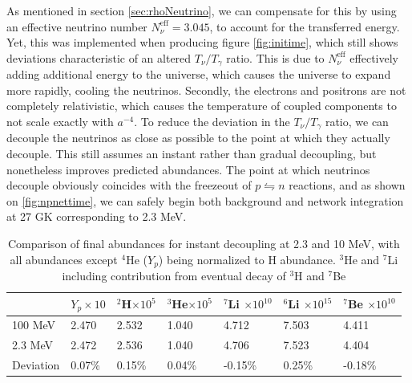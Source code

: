 As mentioned in section \ref{sec:rhoNeutrino}, we can compensate for this by using an effective neutrino number $N_\nu^\text{eff}=3.045$, to account for the transferred energy. Yet, this was implemented when producing figure \ref{fig:initime}, which still shows deviations characteristic of an altered $T_\nu/T_\gamma$ ratio. This is due to $N_\nu^\text{eff}$ effectively adding additional energy to the universe, which causes the universe to expand more rapidly, cooling the neutrinos. Secondly, the electrons and positrons are not completely relativistic, which causes the temperature of coupled components to not scale exactly with $a^{-4}$. To reduce the deviation in the $T_\nu/T_\gamma$ ratio, we can decouple the neutrinos as close as possible to the point at which they actually decouple. This still assumes an instant rather than gradual decoupling, but nonetheless improves predicted abundances. The point at which neutrinos decouple obviously coincides with the freezeout of $p\leftrightharpoons n$ reactions, and as shown on \ref{fig:npnettime}, we can safely begin both background and network integration at 27 GK corresponding to 2.3 MeV. 
\begin{table}[ht]
    \begin{tabular}{l|llllll}
        & $Y_p \times 10$ & \hspace{-0.34em}$^{2}$H$ \times 10^{5}$ & \hspace{-0.34em}$^{3}$He$ \times 10^{5}$ & \hspace{-0.34em}$^{7}$Li $ \times 10^{10}$& \hspace{-0.34em}$^{6}$Li $ \times 10^{15}$& \hspace{-0.34em}$^{7}$Be $ \times 10^{10}$\\ \hline
    100 MeV & 2.470            & 2.532 & 1.040 & 4.712 & 7.503 & 4.411     \\ \hline
    2.3 MeV  & 2.472            & 2.536 & 1.040 & 4.706 & 7.523 & 4.404   \\ \hline
    Deviation & 0.07\%           & 0.15\% & 0.04\% & -0.15\% & 0.25\% & -0.18\%      
    \end{tabular}
    \caption{Comparison of final abundances for instant decoupling at 2.3 and 10 MeV, with all abundances except ${}^4$He ($Y_p$) being normalized to H abundance. ${}^3$He and ${}^7$Li including contribution from eventual decay of ${}^3$H and ${}^7$Be}
    \label{tab:earlylatedecoup}
\end{table}
